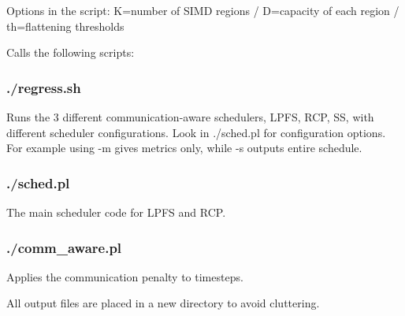 Options in the script: 
  K=number of SIMD regions / D=capacity of each region / th=flattening thresholds

Calls the following scripts:
  
  \subsubsection{./regress.sh}
  
  Runs the 3 different communication-aware schedulers, LPFS, RCP, SS, with different scheduler configurations.
  Look in ./sched.pl for configuration options. For example using -m gives metrics only, while -s outputs entire schedule.

  \subsubsection{./sched.pl}
  The main scheduler code for LPFS and RCP.

  \subsubsection{./comm\_aware.pl}
  Applies the communication penalty to timesteps.

All output files are placed in a new directory to avoid cluttering.


